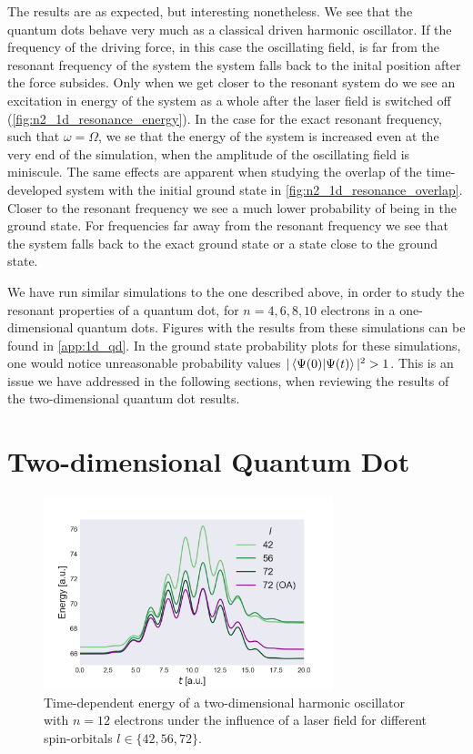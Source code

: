 The results are as expected, but interesting nonetheless. We see that the quantum dots 
behave very much as a classical driven harmonic oscillator. If the frequency of the driving
force, in this case the oscillating field, is far from the resonant frequency of the 
system the system falls back to the inital position after the force subsides. Only when we 
get closer to the resonant system do we see an excitation in energy of the system as 
a whole after the laser field is switched off (\autoref{fig:n2_1d_resonance_energy}).
In the case for the exact resonant frequency,
such that $\omega=\Omega$, we se that the energy of the system is increased even at the very 
end of the simulation, when the amplitude of the oscillating field is miniscule.
The same effects are apparent when studying the overlap of the time-developed system 
with the initial ground state in \autoref{fig:n2_1d_resonance_overlap}. Closer to the
resonant frequency we see a much lower probability of being in the ground state. For 
frequencies far away from the resonant frequency we see that the system falls back to 
the exact ground state or a state close to the ground state.

We have run similar simulations to the one described above, in order to study the 
resonant properties of a quantum dot, for $n=4,6,8,10$ electrons in a one-dimensional 
quantum dots. Figures with the results from these simulations can be found in 
\autoref{app:1d_qd}. In the ground state probability plots for these simulations, 
one would notice unreasonable probability values $|\braket{\Psi(0)}{\Psi(t)}|^2 > 1$.
This is an issue we have addressed in the following sections, when reviewing the results 
of the two-dimensional quantum dot results.


\section{Two-dimensional Quantum Dot}

\begin{figure}
    \centering
    \includegraphics[width=0.75\textwidth]{results/figures/2D/n12_energy.png} 
    \caption{Time-dependent energy of a two-dimensional harmonic oscillator 
        with $n=12$ electrons under the influence of a laser field for different 
        spin-orbitals $l\in\{42,56,72\}$.
    }
    \label{fig:n12_2d_energy}
\end{figure}


